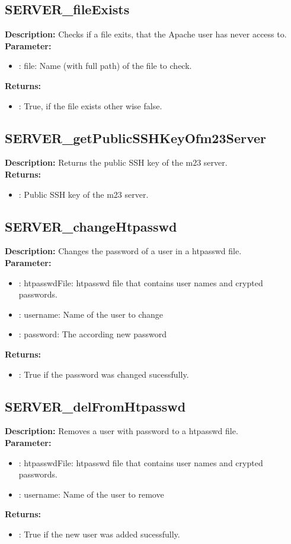 \subsection{SERVER\_fileExists}
\textbf{Description:} Checks if a file exits, that the Apache user has never access to.\\
\textbf{Parameter:}
\begin{itemize}
\item : file: Name (with full path) of the file to check.
\end{itemize}
\textbf{Returns:}
\begin{itemize}
\item : True, if the file exists other wise false.
\end{itemize}

\subsection{SERVER\_getPublicSSHKeyOfm23Server}
\textbf{Description:} Returns the public SSH key of the m23 server.\\
\textbf{Returns:}
\begin{itemize}
\item : Public SSH key of the m23 server.
\end{itemize}

\subsection{SERVER\_changeHtpasswd}
\textbf{Description:} Changes the password of a user in a htpasswd file.\\
\textbf{Parameter:}
\begin{itemize}
\item : htpasswdFile: htpasswd file that contains user names and crypted passwords.
\item : username: Name of the user to change
\item : password: The according new password
\end{itemize}
\textbf{Returns:}
\begin{itemize}
\item : True if the password was changed sucessfully.
\end{itemize}

\subsection{SERVER\_delFromHtpasswd}
\textbf{Description:} Removes a user with password to a htpasswd file.\\
\textbf{Parameter:}
\begin{itemize}
\item : htpasswdFile: htpasswd file that contains user names and crypted passwords.
\item : username: Name of the user to remove
\end{itemize}
\textbf{Returns:}
\begin{itemize}
\item : True if the new user was added sucessfully.
\end{itemize}


